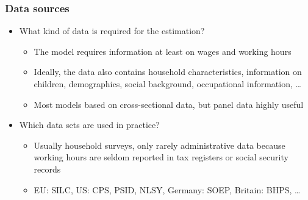 \documentclass[handout,intlimits]{beamer}
\def\blue#1{\textcolor{zewblue}{#1}}
\begin{document}
\begin{frame}
\frametitle{Data sources}
\begin{itemize}
	\item \blue{What kind of data is required for the estimation?}
	\begin{itemize}
		\item The model requires information at least on wages and working hours
		\smallskip
		\item Ideally, the data also contains household characteristics, information on children, demographics, social background, occupational information, \dots
		\smallskip
		\item Most models based on cross-sectional data, but panel data highly useful
	\end{itemize}
	\bigskip
	\item \blue{Which data sets are used in practice?}
	\begin{itemize}
		\item Usually household surveys, only rarely administrative data because working hours are seldom reported in tax registers or social security records
		\smallskip
		\item EU: SILC, US: CPS, PSID, NLSY, Germany: SOEP, Britain: BHPS, \dots
	\end{itemize}
\end{itemize}
\end{frame}
\end{document}
